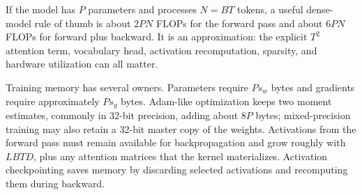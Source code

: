 If the model has $P$ parameters and processes $N=BT$ tokens, a useful dense-model rule of
thumb is about $2PN$ FLOPs for the forward pass and about $6PN$ FLOPs for forward plus
backward. It is an approximation: the explicit $T^2$ attention term, vocabulary head,
activation recomputation, sparsity, and hardware utilization can all matter.

Training memory has several owners. Parameters require $Ps_w$ bytes and gradients require
approximately $Ps_g$ bytes. Adam-like optimization keeps two moment estimates, commonly
in 32-bit precision, adding about $8P$ bytes; mixed-precision training may also retain a
32-bit master copy of the weights. Activations from the forward pass must remain available
for backpropagation and grow roughly with $LBTD$, plus any attention matrices that the
kernel materializes. Activation checkpointing saves memory by discarding selected
activations and recomputing them during backward.

